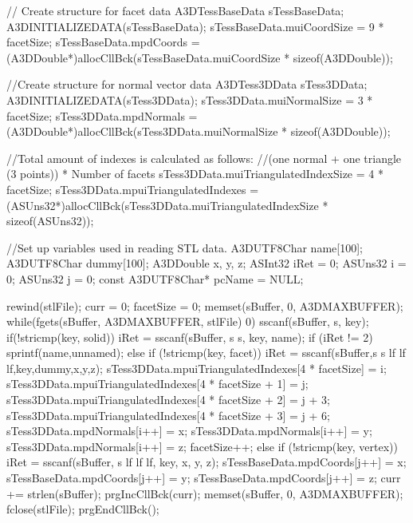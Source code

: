 \documentclass[letterpaper,12pt,english,openany,oneside]{sphinxmanual}
\begin{document}
\begin{sphinxVerbatim}[commandchars=\\\{\}]
// Create structure for facet data
A3DTessBaseData sTessBaseData;
A3D\PYGZus{}INITIALIZE\PYGZus{}DATA(sTessBaseData);
sTessBaseData.m\PYGZus{}uiCoordSize = 9 * facetSize;
sTessBaseData.m\PYGZus{}pdCoords =
  (A3DDouble*)allocCllBck(sTessBaseData.m\PYGZus{}uiCoordSize * sizeof(A3DDouble));

//Create structure for normal vector data
A3DTess3DData sTess3DData;
A3D\PYGZus{}INITIALIZE\PYGZus{}DATA(sTess3DData);
sTess3DData.m\PYGZus{}uiNormalSize = 3 * facetSize;
sTess3DData.m\PYGZus{}pdNormals =
  (A3DDouble*)allocCllBck(sTess3DData.m\PYGZus{}uiNormalSize * sizeof(A3DDouble));


//Total amount of indexes is calculated as follows:
//(one normal + one triangle (3 points)) * Number of facets
sTess3DData.m\PYGZus{}uiTriangulatedIndexSize = 4 * facetSize;
sTess3DData.m\PYGZus{}puiTriangulatedIndexes =
  (ASUns32*)allocCllBck(sTess3DData.m\PYGZus{}uiTriangulatedIndexSize *
      sizeof(ASUns32));


//Set up variables used in reading STL data.
A3DUTF8Char name[100];
A3DUTF8Char dummy[100];
A3DDouble x, y, z;
ASInt32 iRet = 0;
ASUns32 i = 0;
ASUns32 j = 0;
const A3DUTF8Char* pcName = NULL;

rewind(stlFile);
curr = 0;
facetSize = 0;
memset(sBuffer, 0, A3D\PYGZus{}MAX\PYGZus{}BUFFER);
while(fgets(sBuffer, A3D\PYGZus{}MAX\PYGZus{}BUFFER, stlFile) \PYGZgt{} 0) \PYGZob{}
  sscanf(sBuffer, \PYGZdq{}\PYGZpc{}s\PYGZdq{}, key);
  if(!\PYGZus{}stricmp(key, \PYGZdq{}solid\PYGZdq{})) \PYGZob{}
      iRet = sscanf(sBuffer, \PYGZdq{}\PYGZpc{}s \PYGZpc{}s\PYGZdq{}, key, name);
      if (iRet != 2)
          sprintf(name,\PYGZdq{}unnamed\PYGZdq{});
  \PYGZcb{} else if (!\PYGZus{}stricmp(key, \PYGZdq{}facet\PYGZdq{})) \PYGZob{}
      iRet = sscanf(sBuffer,\PYGZdq{}\PYGZpc{}s \PYGZpc{}s \PYGZpc{}lf \PYGZpc{}lf \PYGZpc{}lf\PYGZdq{},key,dummy,\PYGZam{}x,\PYGZam{}y,\PYGZam{}z);
      sTess3DData.m\PYGZus{}puiTriangulatedIndexes[4 * facetSize] = i;
      sTess3DData.m\PYGZus{}puiTriangulatedIndexes[4 * facetSize + 1] = j;
      sTess3DData.m\PYGZus{}puiTriangulatedIndexes[4 * facetSize + 2] = j + 3;
      sTess3DData.m\PYGZus{}puiTriangulatedIndexes[4 * facetSize + 3] = j + 6;
      sTess3DData.m\PYGZus{}pdNormals[i++] = x;
      sTess3DData.m\PYGZus{}pdNormals[i++] = y;
      sTess3DData.m\PYGZus{}pdNormals[i++] = z;
      facetSize++;
  \PYGZcb{} else if (!\PYGZus{}stricmp(key, \PYGZdq{}vertex\PYGZdq{})) \PYGZob{}
      iRet = sscanf(sBuffer, \PYGZdq{}\PYGZpc{}s \PYGZpc{}lf \PYGZpc{}lf \PYGZpc{}lf\PYGZdq{}, key, \PYGZam{}x, \PYGZam{}y, \PYGZam{}z);
      sTessBaseData.m\PYGZus{}pdCoords[j++] = x;
      sTessBaseData.m\PYGZus{}pdCoords[j++] = y;
      sTessBaseData.m\PYGZus{}pdCoords[j++] = z;
  \PYGZcb{}
  curr += strlen(sBuffer);
  prgIncCllBck(curr);
  memset(sBuffer, 0, A3D\PYGZus{}MAX\PYGZus{}BUFFER);
\PYGZcb{}
fclose(stlFile);
prgEndCllBck();



\end{sphinxVerbatim}
\end{document}
